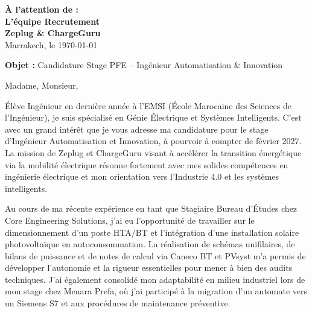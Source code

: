 \documentclass[10pt,a4paper]{../../altacv}
\makeatletter
\renewcommand{\makecvheader}{%
  \begingroup
    \raggedright\color{emphasis}%
    {\Huge\bfseries\MakeUppercase{\@name}\par}
    \medskip
    {\large\bfseries\color{accent}\@tagline\par}
    \medskip
    {\footnotesize\bfseries\@personalinfo\par}
  \endgroup\medskip
}
\makeatother
\begin{document}

\makecvheader

\bigskip
\medskip

\begin{flushright}
  {\color{emphasis}\textbf{À l'attention de :}} \\[2pt]
  \textbf{L'équipe Recrutement} \\
  \textbf{Zeplug \& ChargeGuru} \\[20pt]
  Marrakech, le \today
\end{flushright}
\bigskip

\bigskip

{\color{accent}\textbf{Objet :}} Candidature Stage PFE -- Ingénieur Automatisation \& Innovation

\bigskip\bigskip

Madame, Monsieur,

\vspace{0.4cm}

Élève Ingénieur en dernière année à l'EMSI (École Marocaine des Sciences de l'Ingénieur), je suis spécialisé en Génie Électrique et Systèmes Intelligents. C'est avec un grand intérêt que je vous adresse ma candidature pour le stage d'Ingénieur Automatisation et Innovation, à pourvoir à compter de février 2027. La mission de Zeplug et ChargeGuru visant à accélérer la transition énergétique via la mobilité électrique résonne fortement avec mes solides compétences en ingénierie électrique et mon orientation vers l'Industrie 4.0 et les systèmes intelligents.

\vspace{0.4cm}

Au cours de ma récente expérience en tant que Stagiaire Bureau d'Études chez Core Engineering Solutions, j'ai eu l'opportunité de travailler sur le dimensionnement d'un poste HTA/BT et l'intégration d'une installation solaire photovoltaïque en autoconsommation. La réalisation de schémas unifilaires, de bilans de puissance et de notes de calcul via Caneco BT et PVsyst m'a permis de développer l'autonomie et la rigueur essentielles pour mener à bien des audits techniques. J'ai également consolidé mon adaptabilité en milieu industriel lors de mon stage chez Menara Prefa, où j'ai participé à la migration d'un automate vers un Siemens S7 et aux procédures de maintenance préventive.
\end{document}
